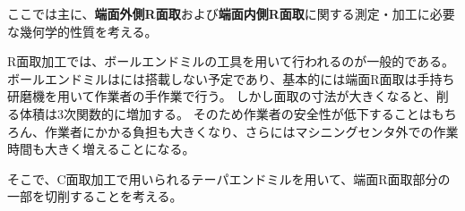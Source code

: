 

ここでは主に、\textbf{端面外側R面取}および\textbf{端面内側R面取}に関する測定・加工に必要な幾何学的性質を考える。

R面取加工では、ボールエンドミルの工具を用いて行われるのが一般的である。
ボールエンドミルは\DMname には搭載しない予定であり、基本的には端面R面取は手持ち研磨機を用いて作業者の手作業で行う。
しかし面取の寸法が大きくなると、削る体積は3次関数的に増加する。
そのため作業者の安全性が低下することはもちろん、作業者にかかる負担も大きくなり、さらにはマシニングセンタ外での作業時間も大きく増えることになる。

そこで、C面取加工で用いられるテーパエンドミルを用いて、端面R面取部分の一部を切削することを考える。



